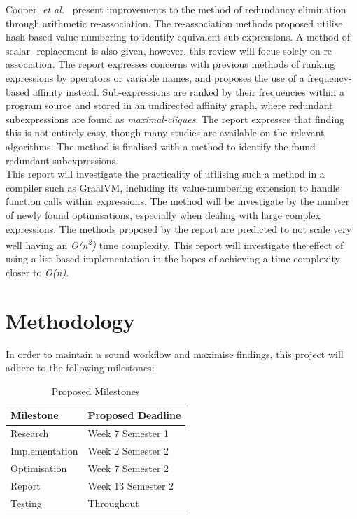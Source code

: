 \documentclass[12pt,openany,a4paper]{book}
\begin{document}
Cooper, \emph{et al.}~\cite{redund} present improvements to the method of redundancy elimination through
arithmetic re-association. The re-association methods proposed utilise hash-based
value numbering to identify equivalent sub-expressions. A method of scalar-
replacement is also given, however, this review will focus solely on re-association.
The report expresses concerns with previous methods of ranking expressions 
by operators or variable names, and proposes the use of a frequency-based affinity
instead. Sub-expressions are ranked by their frequencies within a program source and
stored in an undirected affinity graph, where redundant subexpressions are found
as \emph{maximal-cliques}. The report expresses that finding this is not
entirely easy, though many studies are available on the relevant algorithms.
The method is finalised with a method to identify the found redundant subexpressions.\\
This report will investigate the practicality of utilising such a method in a
compiler such as GraalVM, including its value-numbering extension to handle
function calls within expressions. The method will be investigate by
the number of newly found optimisations, especially when dealing with large
complex expressions. The methods proposed by the report are predicted to
not scale very well having an \emph{O(n\textsuperscript{2})} time complexity.
This report will investigate the effect of using a list-based implementation in
the hopes of achieving a time complexity closer to \emph{O(n)}.

\chapter{Methodology}
\label{methods}

In order to maintain a sound workflow and maximise findings, this project will
adhere to the following milestones:

\begin{table}[ht]
    \begin{center}
        \begin{tabular}{ |p{8cm}|p{4cm}| }
            \hline
            \textbf{Milestone} & \textbf{Proposed Deadline}\\
            \hline
            Research & Week 7 Semester 1\\
            \hline
            Implementation & Week 2 Semester 2\\
            \hline
            Optimisation & Week 7 Semester 2\\
            \hline
            Report & Week 13 Semester 2\\
            \hline
            Testing & Throughout\\
            \hline
        \end{tabular}
        \caption{Proposed Milestones}
        \label{milestones}
    \end{center}
\end{table}
\end{document}
